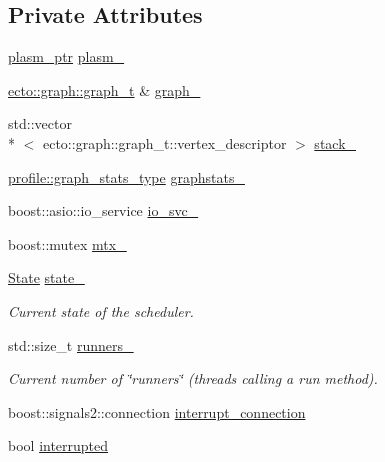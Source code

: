 \subsection*{Private Attributes}
\begin{DoxyCompactItemize}
\item 
\hyperlink{namespaceecto_a6b83be6cd685db71f03b14871653475f}{plasm\-\_\-ptr} \hyperlink{classecto_1_1scheduler_a9ccfb508a5bf75ec7ca69b475a7c7226}{plasm\-\_\-}
\item 
\hyperlink{structecto_1_1graph_1_1graph__t}{ecto\-::graph\-::graph\-\_\-t} \& \hyperlink{classecto_1_1scheduler_a4a9aa8c66b611d13461e631b568fb5a5}{graph\-\_\-}
\item 
std\-::vector\\*
$<$ ecto\-::graph\-::graph\-\_\-t\-::vertex\-\_\-descriptor $>$ \hyperlink{classecto_1_1scheduler_a0c291644c5fc92399a96466ac3b5cc38}{stack\-\_\-}
\item 
\hyperlink{structecto_1_1profile_1_1graph__stats__type}{profile\-::graph\-\_\-stats\-\_\-type} \hyperlink{classecto_1_1scheduler_a6da29ce8fc4f4d2a1c451a577e049c62}{graphstats\-\_\-}
\item 
boost\-::asio\-::io\-\_\-service \hyperlink{classecto_1_1scheduler_af8f90a97a59811157c657cecb8512069}{io\-\_\-svc\-\_\-}
\item 
boost\-::mutex \hyperlink{classecto_1_1scheduler_a47a29f5a0e1f1ab8ce816b0c63442b5c}{mtx\-\_\-}
\item 
\hyperlink{classecto_1_1scheduler_a6b063d1c4bb9dad58d7ace61946b1200}{State} \hyperlink{classecto_1_1scheduler_a21d2aac4a8a2ef665942b7c9b741250c}{state\-\_\-}
\begin{DoxyCompactList}\small\item\em Current state of the scheduler. \end{DoxyCompactList}\item 
std\-::size\-\_\-t \hyperlink{classecto_1_1scheduler_a650d97445fe90ba4572d208430f71e20}{runners\-\_\-}
\begin{DoxyCompactList}\small\item\em Current number of \char`\"{}runners\char`\"{} (threads calling a run method). \end{DoxyCompactList}\item 
boost\-::signals2\-::connection \hyperlink{classecto_1_1scheduler_a7eedec3e00966ffa25a5172bdaa8b7c6}{interrupt\-\_\-connection}
\item 
bool \hyperlink{classecto_1_1scheduler_abbb89be5b75cc481087fc2b2b1f00147}{interrupted}
\end{DoxyCompactItemize}


